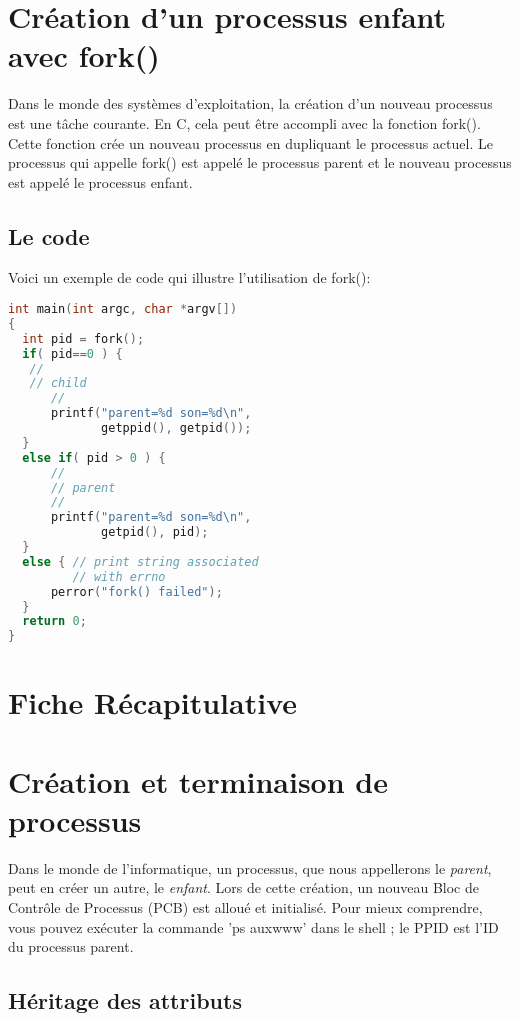 \documentclass[12pt]{report}
\begin{document}
\section{Création d'un processus enfant avec fork()} 

Dans le monde des systèmes d'exploitation, la création d'un nouveau processus est une tâche courante. En C, cela peut être accompli avec la fonction fork(). Cette fonction crée un nouveau processus en dupliquant le processus actuel. Le processus qui appelle fork() est appelé le processus parent et le nouveau processus est appelé le processus enfant. 

\subsection{Le code}

Voici un exemple de code qui illustre l'utilisation de fork():

\begin{lstlisting}[language=C]
int main(int argc, char *argv[])
{
  int pid = fork();
  if( pid==0 ) { 
   //
   // child
      //
      printf("parent=%d son=%d\n",
             getppid(), getpid());
  }
  else if( pid > 0 ) {
      //
      // parent
      //
      printf("parent=%d son=%d\n",
             getpid(), pid);
  }
  else { // print string associated
         // with errno   
      perror("fork() failed"); 
  }
  return 0;
}
\end{lstlisting}


\section*{Fiche Récapitulative}
\section{Création et terminaison de processus}

Dans le monde de l'informatique, un processus, que nous appellerons le \textit{parent}, peut en créer un autre, le \textit{enfant}. Lors de cette création, un nouveau Bloc de Contrôle de Processus (PCB) est alloué et initialisé. Pour mieux comprendre, vous pouvez exécuter la commande 'ps auxwww' dans le shell ; le PPID est l'ID du processus parent.

\subsection{Héritage des attributs}
\end{document}
